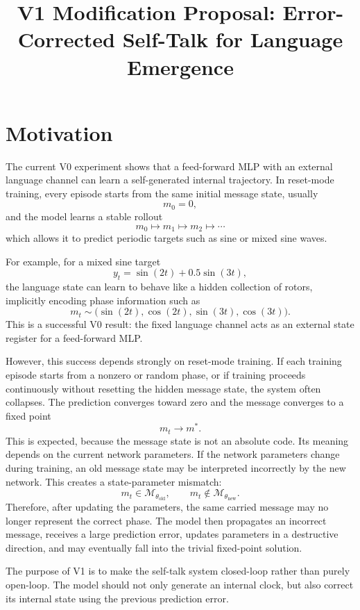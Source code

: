 \documentclass[11pt]{article}
\title{V1 Modification Proposal: Error-Corrected Self-Talk for Language Emergence}
\author{}
\date{}
\begin{document}
\maketitle

\section{Motivation}

The current V0 experiment shows that a feed-forward MLP with an external language channel can learn a self-generated internal trajectory. In reset-mode training, every episode starts from the same initial message state, usually
\[
m_0 = 0,
\]
and the model learns a stable rollout
\[
m_0 \mapsto m_1 \mapsto m_2 \mapsto \cdots
\]
which allows it to predict periodic targets such as sine or mixed sine waves.

For example, for a mixed sine target
\[
y_t = \sin(2t) + 0.5\sin(3t),
\]
the language state can learn to behave like a hidden collection of rotors, implicitly encoding phase information such as
\[
m_t \sim
\bigl(\sin(2t), \cos(2t), \sin(3t), \cos(3t)\bigr).
\]
This is a successful V0 result: the fixed language channel acts as an external state register for a feed-forward MLP.

However, this success depends strongly on reset-mode training. If each training episode starts from a nonzero or random phase, or if training proceeds continuously without resetting the hidden message state, the system often collapses. The prediction converges toward zero and the message converges to a fixed point
\[
m_t \to m^*.
\]
This is expected, because the message state is not an absolute code. Its meaning depends on the current network parameters. If the network parameters change during training, an old message state may be interpreted incorrectly by the new network. This creates a state-parameter mismatch:
\[
m_t \in \mathcal M_{\theta_{\mathrm{old}}},
\qquad
m_t \notin \mathcal M_{\theta_{\mathrm{new}}}.
\]
Therefore, after updating the parameters, the same carried message may no longer represent the correct phase. The model then propagates an incorrect message, receives a large prediction error, updates parameters in a destructive direction, and may eventually fall into the trivial fixed-point solution.

The purpose of V1 is to make the self-talk system closed-loop rather than purely open-loop. The model should not only generate an internal clock, but also correct its internal state using the previous prediction error.
\end{document}
